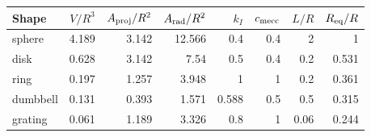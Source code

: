 \begin{tabular}{@{}lrrrrrrr@{}}
\hline
Shape & $V/R^3$ & $A_{\rm proj}/R^2$ & $A_{\rm rad}/R^2$ & $k_I$ & $c_{\rm mecc}$ & $L/R$ & $R_{\rm eq}/R$ \\
\hline
sphere & 4.189 & 3.142 & 12.566 & 0.4 & 0.4 & 2 & 1 \\
disk & 0.628 & 3.142 & 7.54 & 0.5 & 0.4 & 0.2 & 0.531 \\
ring & 0.197 & 1.257 & 3.948 & 1 & 1 & 0.2 & 0.361 \\
dumbbell & 0.131 & 0.393 & 1.571 & 0.588 & 0.5 & 0.5 & 0.315 \\
grating & 0.061 & 1.189 & 3.326 & 0.8 & 1 & 0.06 & 0.244 \\
\hline
\end{tabular}
